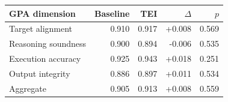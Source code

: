 \begin{tabular}{lrrrr}
\toprule
GPA dimension & Baseline & TEI & $\Delta$ & $p$ \\
\midrule
Target alignment & 0.910 & 0.917 & +0.008 & 0.569 \\
Reasoning soundness & 0.900 & 0.894 & -0.006 & 0.535 \\
Execution accuracy & 0.925 & 0.943 & +0.018 & 0.251 \\
Output integrity & 0.886 & 0.897 & +0.011 & 0.534 \\
\midrule
Aggregate & 0.905 & 0.913 & +0.008 & 0.559 \\
\bottomrule
\end{tabular}
